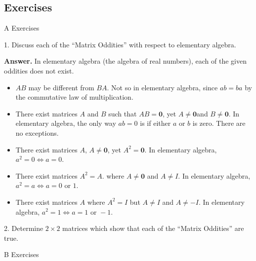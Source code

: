 \documentclass[10pt,]{book}
\theoremstyle{plain}
\theoremstyle{definition}
\theoremstyle{definition}
\theoremstyle{definition}
\theoremstyle{definition}
\begin{document}
\subsection[Exercises]{Exercises}\label{exercises-5-6}
\hypertarget{exercisegroup-7}{}\typeout{************************************************}
\typeout{************************************************}
A Exercises%
\begin{exercisegroup}
\item[1.]\hypertarget{exercise-22}{} Discuss each of the ``Matrix Oddities'' with respect to elementary algebra.%
\par\smallskip
\par\smallskip
\noindent\textbf{Answer.}\hypertarget{answer-12}{}\quad
 In elementary algebra (the algebra of real numbers), each of the given oddities does not exist.%
\par
\leavevmode%
\begin{itemize}[label=\textbullet]
\item{} \(AB\) may be different from \(BA\). Not so in elementary algebra, since \(a b = b a\) by the commutative law of multiplication.%
\item{}There exist matrices \(A\) and \(B\) such that \(AB = \pmb{0}\), yet \(A\neq \pmb{0}\)and \(B\neq \pmb{0}\). In elementary algebra, the only way \(ab = 0\)  is if either \(a\) or \(b\) is zero. There are no exceptions.%
\item{}There exist matrices \(A\), \(A\neq \pmb{0}\), yet \(A^2=\pmb{0}\). In elementary algebra, \(a^2=0\Leftrightarrow a=0\).%
\item{}There exist matrices \(A^2=A\). where \(A\neq \pmb{0}\) and \(A\neq I\). In elementary algebra, \(a^2=a\Leftrightarrow a=0 \textrm{ or } 1\).%
\item{} There exist matrices \(A\) where \(A^2=I\) but \(A\neq I\) and \(A\neq -I\). In elementary algebra, \(a^2=1\Leftrightarrow a=1\textrm{ or 	}-1\).%
\end{itemize}
%
\item[2.]\hypertarget{exercise-23}{} Determine \(2\times 2\) matrices which show that each of the ``Matrix Oddities'' are true.%
\par\smallskip
\end{exercisegroup}
\par\smallskip\noindent
\hypertarget{exercisegroup-8}{}\typeout{************************************************}
\typeout{************************************************}
B Exercises%
\end{document}
